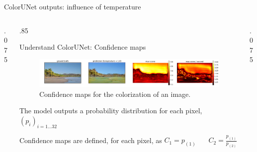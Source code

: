 \documentclass[final]{beamer}
\newlength{\twocolwid}
\begin{document}
\begin{frame}[t]
\begin{columns}[t]
\begin{column}{\twocolwid}
\begin{block}{ColorUNet outputs: influence of temperature}
  \end{block}

  \begin{columns}[t,totalwidth=.7\twocolwid] %
    \begin{column}{.075\twocolwid}\end{column}
    \begin{column}{.85\twocolwid}

    \begin{alertblock}{Understand ColorUNet: Confidence maps}

    \begin{figure}
    \begin{center}
    \includegraphics[width=.6\twocolwid]{img/confidence}
    \caption{Confidence maps for the colorization of an image.}
    \label{confidence}
    \end{center}
    \end{figure}

    The model outputs a probability distribution for each pixel, $(p_i)_{i=1...32}$

    Confidence maps are defined, for each pixel, as
    $C_1 = p_{(1)}\ \ \ \ \ \ \ \  C_2 = \frac{p_{(1)}}{p_{(2)}}$
    \end{alertblock}

    \end{column}
    \begin{column}{.075\twocolwid}\end{column}
  \end{columns}



%
%



\end{column}
\end{columns}
\end{frame}
\end{document}
